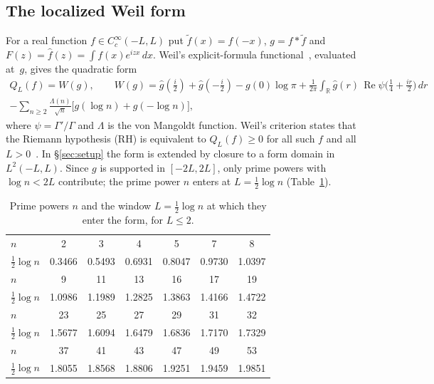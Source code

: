 \documentclass[11pt]{amsart}
\newcommand{\R}{\mathbb{R}}
\newcommand{\re}{\operatorname{Re}}
\theoremstyle{definition}
\theoremstyle{remark}
\numberwithin{equation}{section}
\begin{document}
\subsection{The localized Weil form}
For a real function $f\in C_c^\infty(-L,L)$ put $\tilde f(x)=f(-x)$, $g=f*\tilde f$ and $F(z)=\hat f(z)=\int f(x)e^{izx}\,dx$. Weil's explicit-formula functional~\cite{Weil}, evaluated at~$g$, gives the quadratic form
\begin{multline}\label{eq:weil}
Q_L(f)=W(g),\qquad
W(g)=\hat g(\tfrac i2)+\hat g(-\tfrac i2)-g(0)\log\pi+\frac1{2\pi}\int_\R\hat g(r)\,\re\psi\bigl(\tfrac14+\tfrac{ir}{2}\bigr)\,dr\\
-\sum_{n\ge2}\frac{\Lambda(n)}{\sqrt n}\bigl[g(\log n)+g(-\log n)\bigr],
\end{multline}
where $\psi=\Gamma'/\Gamma$ and $\Lambda$ is the von Mangoldt function. Weil's criterion states that the Riemann hypothesis (RH) is equivalent to $Q_L(f)\ge0$ for all such $f$ and all $L>0$~\cite{Weil,Bombieri}. In \S\ref{sec:setup} the form is extended by closure to a form domain in $L^2(-L,L)$. Since $g$ is supported in $[-2L,2L]$, only prime powers with $\log n<2L$ contribute; the prime power $n$ enters at $L=\tfrac12\log n$ (Table~\ref{tab:primes}).

\begin{table}[ht]
\centering\small
\caption{Prime powers $n$ and the window $L=\tfrac12\log n$ at which they enter the form, for $L\le2$.}\label{tab:primes}
\begin{tabular}{l*{6}{c}}
\toprule
$n$ & 2 & 3 & 4 & 5 & 7 & 8\\
$\tfrac12\log n$ & 0.3466 & 0.5493 & 0.6931 & 0.8047 & 0.9730 & 1.0397\\
\midrule
$n$ & 9 & 11 & 13 & 16 & 17 & 19\\
$\tfrac12\log n$ & 1.0986 & 1.1989 & 1.2825 & 1.3863 & 1.4166 & 1.4722\\
\midrule
$n$ & 23 & 25 & 27 & 29 & 31 & 32\\
$\tfrac12\log n$ & 1.5677 & 1.6094 & 1.6479 & 1.6836 & 1.7170 & 1.7329\\
\midrule
$n$ & 37 & 41 & 43 & 47 & 49 & 53\\
$\tfrac12\log n$ & 1.8055 & 1.8568 & 1.8806 & 1.9251 & 1.9459 & 1.9851\\
\bottomrule
\end{tabular}
\end{table}
\end{document}
